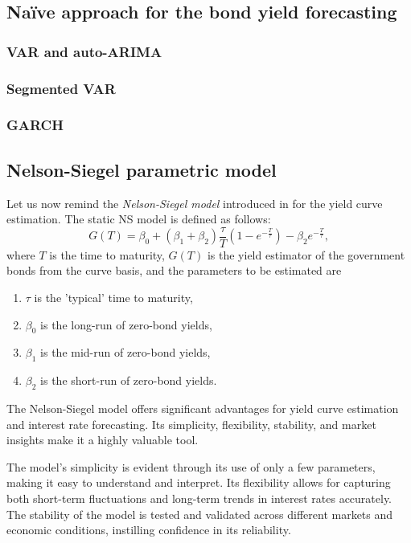     \subsection{Na\"ive approach for the bond yield forecasting}
        \subsubsection{VAR and auto-ARIMA}
        \subsubsection{Segmented VAR}
        \subsubsection{GARCH}

    \subsection{Nelson-Siegel parametric model}
        Let us now remind the \emph{Nelson-Siegel model} introduced in \cite{Nelson1987} for the yield curve estimation. The 
        static NS model is defined as follows:
        \begin{equation}\label{eq:NS}
            G(T) = \beta_0 + (\beta_1+\beta_2)\frac{\tau}{T}\left(1-e^{-\frac{T}{\tau}}\right)-\beta_2  e^{-\frac{T}{\tau}},
        \end{equation}
        where $T$ is the time to maturity, $G(T)$ is the yield estimator of the government bonds from the curve basis, 
        and the parameters to be estimated are
        \begin{enumerate}
            \item $\tau$ is the 'typical' time to maturity, 
            \item $\beta_0$ is the long-run of zero-bond yields, 
            \item $\beta_1$ is the mid-run of zero-bond yields, 
            \item $\beta_2$ is the short-run of zero-bond yields.
        \end{enumerate}

        The Nelson-Siegel model offers significant advantages for yield curve estimation and interest rate forecasting. 
        Its simplicity, flexibility, stability, and market insights make it a highly valuable tool.

        The model's simplicity is evident through its use of only a few parameters, making it easy to understand and 
        interpret. Its flexibility allows for capturing both short-term fluctuations and long-term trends in interest 
        rates accurately. The stability of the model is tested and validated across different markets and economic 
        conditions, instilling confidence in its reliability.
        
